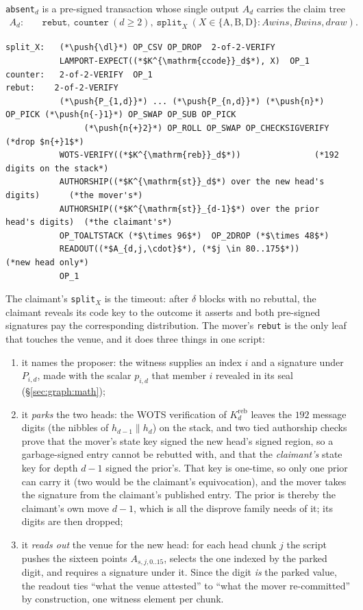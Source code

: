 \documentclass[11pt]{article}
\newcommand{\push}[1]{\ensuremath{\langle #1\rangle}}
\newcommand{\dl}{\delta}
\begin{document}
\texttt{absent}$_d$ is a pre-signed transaction whose single output
$A_d$ carries the claim tree
\begin{align*}
  A_d:\quad & \texttt{rebut},\ \texttt{counter}\ (d \ge 2),\
  \texttt{split}_X\ (X \in \{\text{A},\text{B},\text{D}\}: A wins, B wins, draw).
\end{align*}
\begin{lstlisting}[style=script]
split_X:   (*\push{\dl}*) OP_CSV OP_DROP  2-of-2-VERIFY
           LAMPORT-EXPECT((*$K^{\mathrm{ccode}}_d$*), X)  OP_1
counter:   2-of-2-VERIFY  OP_1
rebut:    2-of-2-VERIFY
           (*\push{P_{1,d}}*) ... (*\push{P_{n,d}}*) (*\push{n}*) OP_PICK (*\push{n{-}1}*) OP_SWAP OP_SUB OP_PICK
                (*\push{n{+}2}*) OP_ROLL OP_SWAP OP_CHECKSIGVERIFY  (*drop $n{+}1$*)
           WOTS-VERIFY((*$K^{\mathrm{reb}}_d$*))               (*192 digits on the stack*)
           AUTHORSHIP((*$K^{\mathrm{st}}_d$*) over the new head's digits)      (*the mover's*)
           AUTHORSHIP((*$K^{\mathrm{st}}_{d-1}$*) over the prior head's digits)  (*the claimant's*)
           OP_TOALTSTACK (*$\times 96$*)  OP_2DROP (*$\times 48$*)
           READOUT((*$A_{d,j,\cdot}$*), (*$j \in 80..175$*))            (*new head only*)
           OP_1
\end{lstlisting}
The claimant's \texttt{split}$_X$ is the timeout: after $\dl$ blocks
with no rebuttal, the claimant reveals its code key to the outcome it
asserts and both pre-signed signatures pay the corresponding
distribution. The mover's \texttt{rebut} is the only leaf that touches
the venue, and it does three things in one script:
\begin{enumerate}
\item it names the proposer: the witness supplies an index $i$ and a
  signature under $P_{i,d}$, made with the scalar $p_{i,d}$ that member
  $i$ revealed in its seal (\S\ref{sec:graph:math});
\item it \emph{parks} the two heads: the WOTS verification of
  $K^{\mathrm{reb}}_d$ leaves the $192$ message digits (the nibbles of
  $h_{d-1}\|h_d$) on the stack, and two tied authorship checks prove
  that the mover's state key signed the new head's signed region, so a
  garbage-signed entry cannot be rebutted with, and that the
  \emph{claimant's} state key for depth $d-1$ signed the prior's. That
  key is one-time, so only one prior can carry it (two would be the
  claimant's equivocation), and the mover takes the signature from the
  claimant's published entry. The prior is thereby the claimant's own
  move $d-1$, which is all the disprove family needs of it; its digits
  are then dropped;
\item it \emph{reads out} the venue for the new head: for each head chunk $j$ the script
  pushes the sixteen points $A_{s,j,0..15}$, selects the one indexed by
  the parked digit, and requires a signature under it. Since the digit
  \emph{is} the parked value, the readout ties ``what the venue attested''
  to ``what the mover re-committed'' by construction, one witness
  element per chunk.
\end{enumerate}
\end{document}
